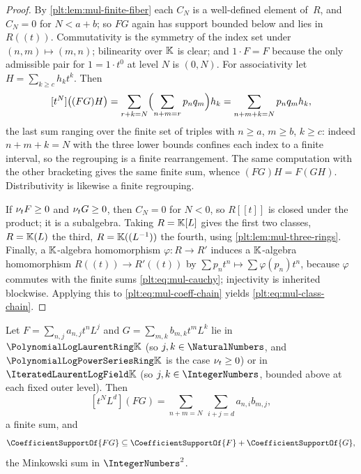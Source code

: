 \begin{proof}
By \cref{plt:lem:mul-finite-fiber} each $C_N$ is a well-defined element
of~$R$, and $C_N=0$ for $N<a+b$; so $FG$ again has support bounded below and
lies in $R((t))$.  Commutativity is the symmetry of the index set under
$(n,m)\mapsto(m,n)$; bilinearity over $\mathbb{K}$ is clear; and $1\cdot F=F$ because
the only admissible pair for $1=1\cdot t^0$ at level $N$ is $(0,N)$.  For
associativity let $H=\sum_{k\ge c}h_kt^k$.  Then
\[
 [t^N]\bigl((FG)H\bigr)
 =\sum_{r+k=N}\Bigl(\sum_{n+m=r}p_nq_m\Bigr)h_k
 =\sum_{n+m+k=N}p_nq_mh_k,
\]
the last sum ranging over the finite set of triples with $n\ge a$, $m\ge b$,
$k\ge c$: indeed $n+m+k=N$ with the three lower bounds confines each index to
a finite interval, so the regrouping is a finite rearrangement.  The same
computation with the other bracketing gives the same finite sum, whence
$(FG)H=F(GH)$.  Distributivity is likewise a finite regrouping.

If $\nu_{t} F\ge0$ and $\nu_{t} G\ge0$, then $C_N=0$ for $N<0$, so $R[[t]]$ is
closed under the product; it is a subalgebra.  Taking $R=\mathbb{K}[L]$ gives the
first two classes, $R=\mathbb{K}(L)$ the third, $R=\mathbb{K}((L^{-1}))$ the fourth, using
\cref{plt:lem:mul-three-rings}.  Finally, a $\mathbb{K}$-algebra homomorphism
$\varphi\colon R\to R'$ induces a $\mathbb{K}$-algebra homomorphism
$R((t))\to R'((t))$ by $\sum p_nt^n\mapsto\sum\varphi(p_n)t^n$, because
$\varphi$ commutes with the finite sums \eqref{plt:eq:mul-cauchy}; injectivity
is inherited blockwise.  Applying this to
\eqref{plt:eq:mul-coeff-chain} yields \eqref{plt:eq:mul-class-chain}.
\end{proof}

\begin{proposition}
\label{plt:prop:mul-monomial}
Let $F=\sum_{n,j}a_{n,j}t^nL^j$ and $G=\sum_{m,k}b_{m,k}t^mL^k$ lie in
$\PLlau$ (so $j,k\in\NaturalNumbers$, and $\PLpow$ is the case
$\nu_{t}\ge0$) or in $\PLit$ (so $j,k\in\IntegerNumbers$, bounded above at
each fixed outer level).  Then
\begin{equation}\label{plt:eq:mul-2d-convolution}
 [t^NL^d](FG)
 =\sum_{n+m=N}\ \sum_{i+j=d}a_{n,i}b_{m,j},
\end{equation}
a finite sum, and
\begin{equation}\label{plt:eq:mul-support}
 \CoefficientSupportOf{FG}
 \subseteq
 \CoefficientSupportOf{F}+\CoefficientSupportOf{G},
\end{equation}
the Minkowski sum in $\IntegerNumbers^2$.
\end{proposition}

